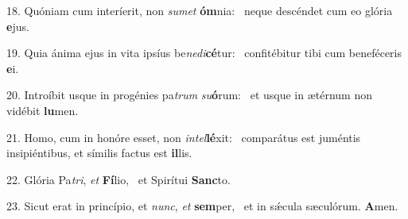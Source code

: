 18. Quóniam cum interíerit, non \textit{su}\textit{met} \textbf{óm}nia: \ast\  neque descéndet cum eo glória \textbf{e}jus.\

19. Quia ánima ejus in vita ipsíus be\textit{ne}\textit{di}\textbf{cé}tur: \ast\  confitébitur tibi cum beneféceris \textbf{e}i.\

20. Introíbit usque in progénies pa\textit{trum} \textit{su}\textbf{ó}rum: \ast\  et usque in ætérnum non vidébit \textbf{lu}men.\

21. Homo, cum in honóre esset, non \textit{in}\textit{tel}\textbf{lé}xit: \ast\  comparátus est juméntis insipiéntibus, et símilis factus est \textbf{il}lis.\

22. Glória Pa\textit{tri}, \textit{et} \textbf{Fí}lio, \ast\  et Spirítui \textbf{Sanc}to.\

23. Sicut erat in princípio, et \textit{nunc}, \textit{et} \textbf{sem}per, \ast\  et in sǽcula sæculórum. \textbf{A}men.\

